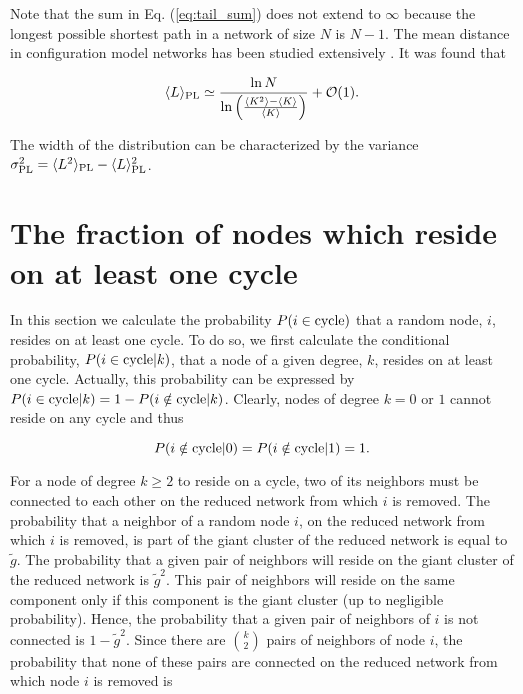 \documentclass[preprint,pre,superscriptaddress,showpacs]{revtex4}
\begin{document}
\noindent
Note that the sum in 
Eq.
(\ref{eq:tail_sum})
does not extend to $\infty$ because 
the longest possible shortest path in a 
network of size $N$ is $N-1$.
The mean distance in configuration model
networks has been studied extensively
\cite{Newman2001,Chung2002,Chung2003,Hofstad2007,Esker2008}.
It was found that 

\begin{equation}
\langle L \rangle_{\rm PL}
\simeq 
\frac{\ln N}{\ln \left(\frac{\langle K^2 \rangle - \langle K \rangle}
{\langle K \rangle}\right)} + {\cal O}(1). 
\label{eq:mean_ellold}
\end{equation}

\noindent
The width of the distribution 
can be characterized by the
variance
$\sigma_{\rm PL}^2 
= 
\langle L^2 \rangle_{\rm PL} 
- 
\langle L \rangle_{\rm PL}^2$.

\section{The fraction of nodes which reside on at least one cycle}

In this section we calculate the probability 
$P(i \in {\rm cycle})$
that a random node, $i$,
resides on at least one cycle.
To do so, we first calculate the conditional probability,
$P(i \in {\rm cycle} | k)$,
that a node of a given degree, $k$,
resides on at least one cycle.
Actually, this probability can be expressed by
$P(i \in {\rm cycle} | k ) = 1 - P(i \notin {\rm cycle} |k)$.
Clearly, nodes of degree $k=0$ or $1$ cannot reside on
any cycle and thus

\begin{equation}
P(i \notin {\rm cycle} | 0)=P(i \notin {\rm cycle} | 1) =1.
\end{equation}

\noindent 
For a node of degree $k \ge 2$ to reside on a cycle,
two of its neighbors must be connected to each other on 
the reduced network from which $i$ is removed.
The probability that a neighbor of a random node $i$, on the
reduced network from which $i$ is removed, is part of the
giant cluster of the reduced network is equal to $\tilde g$.
The probability that a given pair of neighbors will reside on
the giant cluster of the reduced network is ${\tilde g}^2$.
This pair of neighbors will reside on the same component only
if this component is the giant cluster (up to negligible probability).
Hence, the probability that a given pair of neighbors of $i$ is
not connected is $1 - {\tilde g}^2$.
Since there are $\binom{k}{2}$ pairs of neighbors of node $i$,
the probability that none of these pairs are connected on the
reduced network from which node $i$ is removed is
\end{document}
